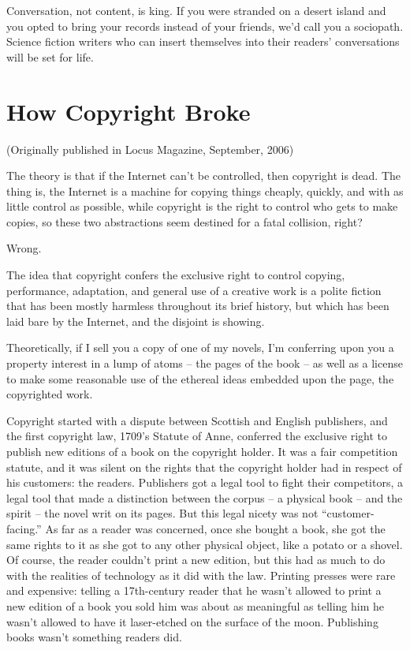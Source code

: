 Conversation, not content, is king. If you were stranded on a
desert island and you opted to bring your records instead of your
friends, we'd call you a sociopath. Science fiction writers who can
insert themselves into their readers' conversations will be set for
life.

\section{How Copyright Broke}

(Originally published in Locus Magazine, September, 2006)

The theory is that if the Internet can't be controlled, then
copyright is dead. The thing is, the Internet is a machine for
copying things cheaply, quickly, and with as little control as
possible, while copyright is the right to control who gets to make
copies, so these two abstractions seem destined for a fatal
collision, right?

Wrong.

The idea that copyright confers the exclusive right to control
copying, performance, adaptation, and general use of a creative
work is a polite fiction that has been mostly harmless throughout
its brief history, but which has been laid bare by the Internet,
and the disjoint is showing.

Theoretically, if I sell you a copy of one of my novels, I'm
conferring upon you a property interest in a lump of atoms -- the
pages of the book -- as well as a license to make some reasonable
use of the ethereal ideas embedded upon the page, the copyrighted
work.

Copyright started with a dispute between Scottish and English
publishers, and the first copyright law, 1709's Statute of Anne,
conferred the exclusive right to publish new editions of a book on
the copyright holder. It was a fair competition statute, and it was
silent on the rights that the copyright holder had in respect of
his customers: the readers. Publishers got a legal tool to fight
their competitors, a legal tool that made a distinction between the
corpus -- a physical book -- and the spirit -- the novel writ on
its pages. But this legal nicety was not ``customer-facing.'' As far
as a reader was concerned, once she bought a book, she got the same
rights to it as she got to any other physical object, like a potato
or a shovel. Of course, the reader couldn't print a new edition,
but this had as much to do with the realities of technology as it
did with the law. Printing presses were rare and expensive: telling
a 17th-century reader that he wasn't allowed to print a new edition
of a book you sold him was about as meaningful as telling him he
wasn't allowed to have it laser-etched on the surface of the moon.
Publishing books wasn't something readers did.

